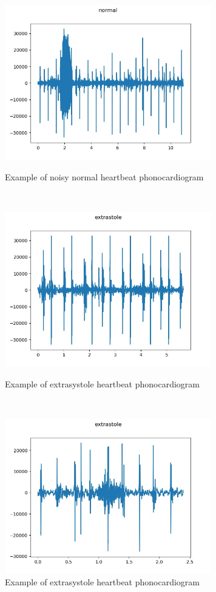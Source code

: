 \documentclass[11pt, a4papper]{report}
\theoremstyle{plain}
\theoremstyle{definition}
\theoremstyle{definition}
\theoremstyle{proposition}
\begin{document}
\begin{figure}[H]
\includegraphics[width=9cm]{img/beforenorm/normal_noisynormal_127_1306764300147_D1.jpg}
\centering
\caption{Example of noisy normal heartbeat phonocardiogram}
\

\includegraphics[width=9cm]{img/beforenorm/extrastole__209_1308162216750_D.jpg}
\centering
\caption{Example of extrasystole heartbeat phonocardiogram}
\

\includegraphics[width=9cm]{img/beforenorm/extrastole__154_1306935608852_D2.jpg}
\centering
\caption{Example of extrasystole heartbeat phonocardiogram}

\end{figure}
\
\end{document}

